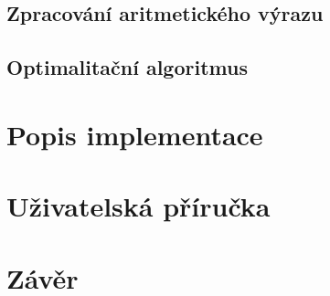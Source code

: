 \documentclass[a4paper,12pt,oneside]{report}
\begin{document}
\section{Zpracování aritmetického výrazu}

\section{Optimalitační algoritmus}

\chapter{Popis implementace}

\chapter{Uživatelská příručka}

\chapter{Závěr}
\end{document}

